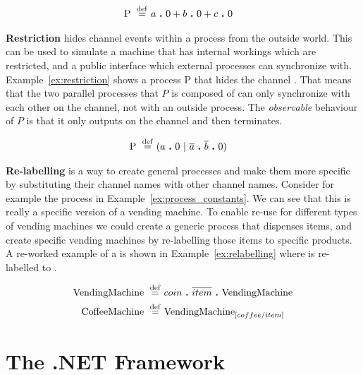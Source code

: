 	\begin{Exa}\label{ex:non_determinism}
	\begin{align*}
			\mathrm{P} \ \stackrel{\mathrm{def}}{=}\  & a \ \textbf{.}\  0 + b \ \textbf{.}\  0 + c \ \textbf{.}\  0
	\end{align*}	
	\end{Exa}
	
	\textbf{Restriction} hides channel events within a process from the outside 
	world. This can be used to simulate a machine that has internal workings 
	which are restricted, and a public interface which external processes can	
	synchronize with. Example~\ref{ex:restriction} shows a process P that hides 
	the channel . That means that the two parallel processes that $P$ 
	is composed of can only synchronize with each other on the  
	channel, not with an outside process. The \textit{observable} behaviour of 
	$P$ is that it only outputs on the  channel and then terminates.
	
	\begin{Exa}\label{ex:restriction}
	\begin{align*}
			\mathrm{P} \ \stackrel{\mathrm{def}}{=}\  & (a \ \textbf{.}\  0 \ |\  \overline{a} \ \textbf{.}\  \overline{b} \ \textbf{.}\  0)  			
	\end{align*}	
	\end{Exa}

	\textbf{Re-labelling} is a way to create general processes and make them 
	more specific by substituting their channel names with other channel names. 
	Consider for example the  process in 
	Example~\ref{ex:process_constants}. We can see that this is really a 
	specific version of a vending machine. To enable re-use for different types 
	of vending machines we could create a generic  process 
	that dispenses items, and create specific vending machines by re-labelling 
	those items to specific products. A re-worked example of a 
	 is shown in Example~\ref{ex:relabelling} where 
	 is re-labelled to .
	
	\begin{Exa}\label{ex:relabelling}
	\begin{align*}
			\mathrm{VendingMachine} \ \stackrel{\mathrm{def}}{=}\  & coin \ \textbf{.}\  \overline{item} \ \textbf{.}\  \mathrm{VendingMachine} \\
			\mathrm{CoffeeMachine} \ \stackrel{\mathrm{def}}{=}\  & \mathrm{VendingMachine}_{[coffee/item]}
	\end{align*}	
	\end{Exa}
	
	
\section{The .NET Framework}

